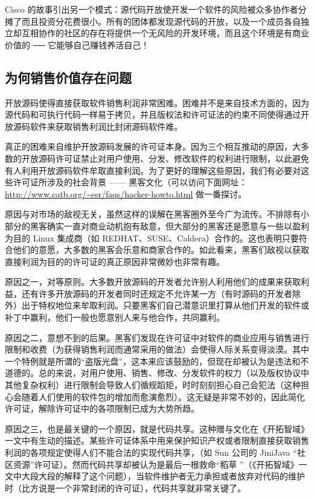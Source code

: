 Cisco 的故事引出另一个模式：源代码开放使开发一个软件的风险被众多协作者分摊了而且投资分花费很小。所有的团体都发现源代码的开放，以及一个成员各自独立却互相协作的社区的存在将提供一个无风险的开发环境，而且这个环境是有商业价值的  ──  它能够自己赚钱养活自己！


\subsection{为何销售价值存在问题}
开放源码使得直接获取软件销售利润非常困难。困难并不是来自技术方面的，因为源代码和可执行代码一样易于拷贝，并且版权法和许可证法的约束不同使得通过开放源码软件来获取销售利润比封闭源码软件难。


真正的困难来自维护开放源码发展的许可证本身。因为三个相互推动的原因，大多数的开放源码许可证禁止对用户使用、分发、修改软件的权利进行限制，以此避免有人利用开放源码软件牟取直接利润。为了更好的理解这些原因，我们有必要对这些许可证所涉及的社会背景 —— 黑客文化（可以访问下面网址：\url{http://www.catb.org/~esr/faqs/hacker-howto.html} 做一番探讨。


原因与对市场的敌视无关，虽然这样的误解在黑客圈外至今广为流传。不排除有小部分的黑客确实一直对商业动机抱有敌意，但大部分的黑客还是愿意与一些以盈利为目的 Linux 集成商（如 REDHAT、SUSE、Caldera）合作的。这也表明只要符合他们的意愿，大多数的黑客会乐意和商家合作的。如此看来，黑客们敌视以获取直接利润为目的的许可证的真正原因非常微妙也非常有趣。


原因之一，对等原则。大多数开放源码的开发者允许别人利用他们的成果来获取利益，还有许多开放源码的开发者同时还规定不允许某一方（有时源码的开发者除外）出于特权地位来牟取利润。只要黑客们自己潜意识里打算从他们开发的软件或补丁中赢利，他们一般也愿意别人来与他合作，共同赢利。


原因之二，意想不到的后果。黑客们发现在许可证中对软件的商业应用与销售进行限制和收费（为获得销售利润而通常采用的做法）会使得人际关系变得淡漠。其中一个特例就是所谓的“盗版光盘”，这本来应该鼓励的，但现在却被认为是违法和不道德的。总的来说，对用户使用、销售、修改、分发软件的权力（以及版权协议中其他复杂权利）进行限制会导致人们循规蹈矩，时时刻刻担心自己会犯法（这种担心会随着人们使用的软件包的增加而愈演愈烈）。这无疑是非常不妙的，因此简化许可证，解除许可证中的各项限制已成为大势所趋。


原因之三，也是最关键的一个原因，就是代码共享。这种赠与文化在《开拓智域》一文中有生动的描述。某些许可证体系中用来保护知识产权或者限制直接获取销售利润的各项规定使得人们不能合法的实现代码共享，（如 Sun 公司的 JiniJava “社区资源”许可证）。然而代码共享却被认为是最后一根救命“稻草 ”（《开拓智域》一文中大段大段的解释了这个问题），当软件维护者无力承担或者放弃对代码的维护时（比方说是一个非常封闭的许可证），代码共享就非常关键了。


